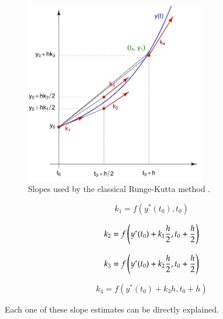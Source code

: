  \begin{figure}[hbt!]
	\centering
	\begin{framed}
	\includegraphics[width=0.7\textwidth]{Figures/F.JPG}
		\end{framed}
	\caption{Slopes used by the classical Runge-Kutta method \cite{hossain2017comparative}.}
	\label{fig:6}
\end{figure}

\newpage

\begin{equation}
    {k_1} = f({y^*}({t_0}),{t_0})
\end{equation}

\begin{equation}
    {k_2} = f\left( {{y^*}({t_0}) + {k_1}{h \over 2},{t_0} + {h \over 2}} \right)
\end{equation}

\begin{equation}
     {k_3} = f\left( {{y^*}({t_0}) + {k_2}{h \over 2},{t_0} + {h \over 2}} \right) 
\end{equation}

\begin{equation}
    {k_4} = f\left( {{y^*}({t_0}) + {k_3}h,{t_0} + h} \right)
\end{equation}

Each one of these slope estimates can be directly explained. 

